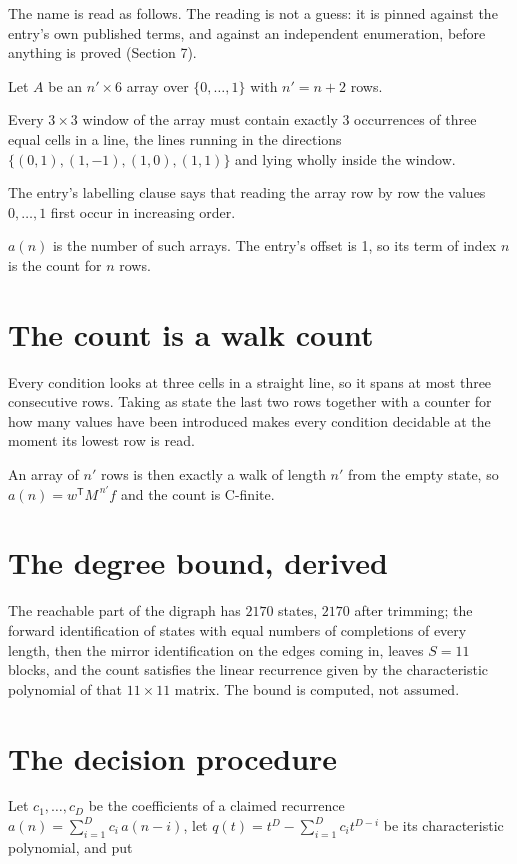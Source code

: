 \documentclass[11pt]{article}
\theoremstyle{definition}
\begin{document}
The name is read as follows. The reading is not a guess: it is pinned against the entry's own published terms, and against an independent enumeration, before anything is proved (Section 7).

Let $A$ be an $n' \times 6$ array over $\{0,\dots,1\}$ with $n' = n + 2$ rows.

Every $3\times3$ window of the array must contain exactly $3$ occurrences of three equal cells in a line, the lines running in the directions $\{(0,1), (1,-1), (1,0), (1,1)\}$ and lying wholly inside the window.

The entry's labelling clause says that reading the array row by row the values $0,\dots,1$ first occur in increasing order.

$a(n)$ is the number of such arrays. The entry's offset is 1, so its term of index $n$ is the count for $n$ rows.

\section{The count is a walk count}

Every condition looks at three cells in a straight line, so it spans at most three consecutive rows. Taking as state the last two rows together with a counter for how many values have been introduced makes every condition decidable at the moment its lowest row is read.

An array of $n'$ rows is then exactly a walk of length $n'$ from the empty state, so $a(n) = w^{\mathsf T}M^{\,n'}f$ and the count is C-finite.

\section{The degree bound, derived}

The reachable part of the digraph has $2170$ states, $2170$ after trimming; the forward identification of states with equal numbers of completions of every length, then the mirror identification on the edges coming in, leaves $S = 11$ blocks, and the count satisfies the linear recurrence given by the characteristic polynomial of that $11\times11$ matrix. The bound is computed, not assumed.

\section{The decision procedure}

Let $c_1,\dots,c_D$ be the coefficients of a claimed recurrence $a(n) = \sum_{i=1}^{D} c_i\,a(n-i)$, let $q(t) = t^{D} - \sum_{i=1}^{D} c_i t^{D-i}$ be its characteristic polynomial, and put
\end{document}
